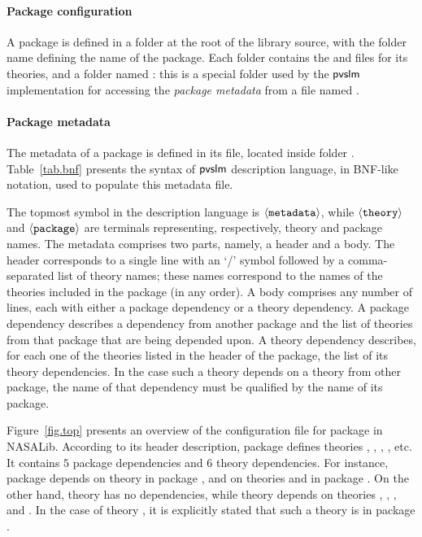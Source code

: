 \paragraph{Package configuration}
A package is defined in a folder at the root of the library source,
with the folder name defining the name of the package. Each folder
contains the  and  files for its theories, and a
folder named : this is a special folder used by the
$\textsf{pvslm}$ implementation for accessing the {\em package metadata} from
a file named .

\paragraph{Package metadata} The metadata of a package is defined
in its  file, located inside folder
. Table~\ref{tab.bnf} presents the syntax of $\textsf{pvslm}$
description language, in BNF-like notation, used to populate this
metadata file.

The topmost symbol in the description language is
$\langle{\texttt{metadata}}\rangle$, while $\langle{\texttt{theory}}\rangle$ and
$\langle{\texttt{package}}\rangle$ are terminals representing, respectively,
theory and package names. The metadata comprises two parts, namely, a
header and a body. The header corresponds to a single line with an `/'
symbol followed by a comma-separated list of theory names; these names
correspond to the names of the theories included in the package (in
any order). A body comprises any number of lines, each with either a
package dependency or a theory dependency. A package dependency
describes a dependency from another package and the list of theories
from that package that are being depended upon. A theory dependency
describes, for each one of the theories listed in the header of the
package, the list of its theory dependencies. In the case such a
theory depends on a theory from other package, the name of that
dependency must be qualified by the name of its package.

Figure~\ref{fig.top} presents an overview of the configuration file
for package  in NASALib. According to its header
description, package  defines theories ,
, , , etc. It contains $5$
package dependencies and $6$ theory dependencies. For instance,
package  depends on theory  in package
, and on theories  and
 in package . On the
other hand, theory  has no dependencies, while theory
 depends on theories , ,
, and . In the case of theory
, it is explicitly stated that such a theory is in package
.

\begin{figure*}[pthb]
  \centering
  \begin{minipage}[c]{0.8\textwidth}%
	\begin{center}
    
  \end{center}
\end{minipage}
  \caption{Overview of metadata file for package  in NASALib.}
  \label{fig.top}
\end{figure*}
